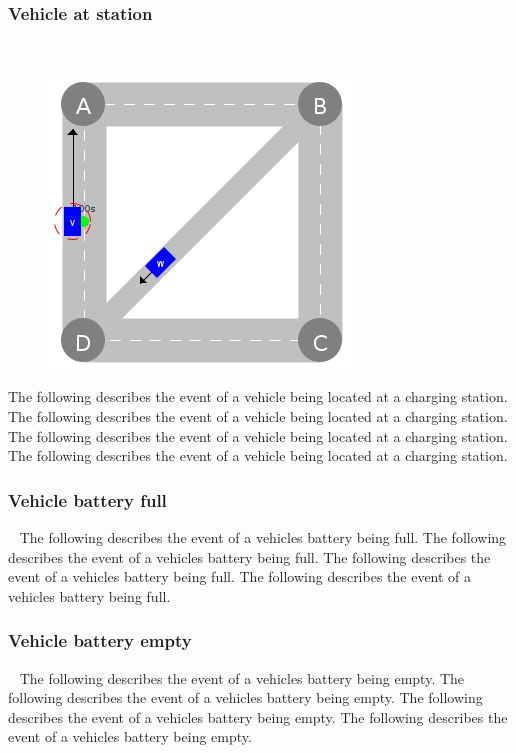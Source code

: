 \documentclass[graybox]{svmult}
\begin{document}
\subsubsection{Vehicle at station}
\
\begin{figure}
	\centering
		\includegraphics[scale=0.35]{../../events/vehicle-at-demand-drop-off.png}
\end{figure}

The following describes the event of a vehicle being located at a charging station.
The following describes the event of a vehicle being located at a charging station.
The following describes the event of a vehicle being located at a charging station.
The following describes the event of a vehicle being located at a charging station.

\subsubsection{Vehicle battery full}
\
The following describes the event of a vehicles battery being full.
The following describes the event of a vehicles battery being full.
The following describes the event of a vehicles battery being full.
The following describes the event of a vehicles battery being full.

\subsubsection{Vehicle battery empty}
\
The following describes the event of a vehicles battery being empty.
The following describes the event of a vehicles battery being empty.
The following describes the event of a vehicles battery being empty.
The following describes the event of a vehicles battery being empty.
\end{document}
